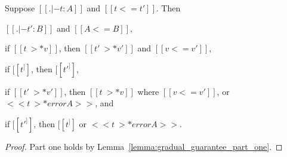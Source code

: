 \begin{theorem}
  \label{thm:gradual_guarantee}
  Suppose $[[. |- t : A]]$ and $[[t <= t']]$.  Then
  \begin{enumR}
  \item $[[. |- t' : B]]$ and $[[A <= B]]$,
  \item if $[[t ~>* v]]$, then $[[t' ~>* v']]$ and $[[v <= v']]$,
  \item if $[[t ^]]$, then $[[t' ^]]$,
  \item if $[[t' ~>* v']]$, then $[[t ~>* v]]$ where $[[v <= v']]$, or $<<t ~>* error A>>$, and
  \item if $[[t' ^]]$, then $[[t ^]]$ or $<<t ~>* error A>>$.
  \end{enumR}
\end{theorem}
\begin{proof}
  Part one holds by Lemma~\ref{lemma:gradual_guarantee_part_one}.
\end{proof}

